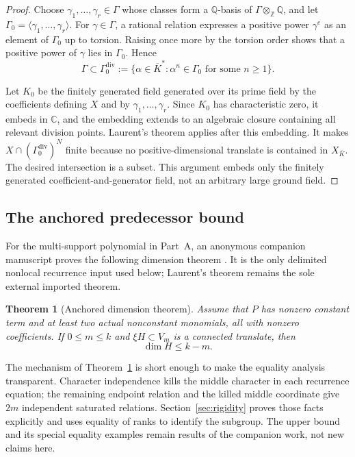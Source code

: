 \documentclass[11pt]{article}
\newcommand{\Z}{\mathbb{Z}}
\newcommand{\Q}{\mathbb{Q}}
\newcommand{\divh}{\mathrm{div}}
\newtheorem{theorem}[lemma]{Theorem}
\theoremstyle{remark}
\numberwithin{equation}{section}
\begin{document}
\begin{proof}
Choose \(\gamma_1,\ldots,\gamma_r\in\Gamma\) whose classes form a \(\Q\)-basis of \(\Gamma\otimes_\Z\Q\), and let \(\Gamma_0=\langle\gamma_1,\ldots,\gamma_r\rangle\).  For \(\gamma\in\Gamma\), a rational relation expresses a positive power \(\gamma^e\) as an element of \(\Gamma_0\) up to torsion.  Raising once more by the torsion order shows that a positive power of \(\gamma\) lies in \(\Gamma_0\).  Hence
\[
 \Gamma\subset\Gamma_0^{\divh}
 :=\{\alpha\in\overline K^\ast:\alpha^n\in\Gamma_0
 \text{ for some }n\geq1\}.
\]

Let \(K_0\) be the finitely generated field generated over its prime field by the coefficients defining \(X\) and by \(\gamma_1,\ldots,\gamma_r\).  Since \(K_0\) has characteristic zero, it embeds in \(\mathbb C\), and the embedding extends to an algebraic closure containing all relevant division points.  Laurent's theorem applies after this embedding.  It makes \(X\cap(\Gamma_0^{\divh})^N\) finite because no positive-dimensional translate is contained in \(X_{\overline K}\).  The desired intersection is a subset.  This argument embeds only the finitely generated coefficient-and-generator field, not an arbitrary large ground field.
\end{proof}

\subsection{The anchored predecessor bound}

For the multi-support polynomial in Part~A, an anonymous companion manuscript proves the following dimension theorem \citep{companionDecay}.  It is the only delimited nonlocal recurrence input used below; Laurent's theorem remains the sole external imported theorem.

\begin{theorem}[Anchored dimension theorem]\label{thm:anchored-bound}
Assume that \(P\) has nonzero constant term and at least two actual nonconstant monomials, all with nonzero coefficients.  If \(0\leq m\leq k\) and \(\xi H\subset V_m\) is a connected translate, then
\[
 \dim H\leq k-m.
\]
\end{theorem}

The mechanism of Theorem~\ref{thm:anchored-bound} is short enough to make the equality analysis transparent.  Character independence kills the middle character in each recurrence equation; the remaining endpoint relation and the killed middle coordinate give \(2m\) independent saturated relations.  Section~\ref{sec:rigidity} proves those facts explicitly and uses equality of ranks to identify the subgroup.  The upper bound and its special equality examples remain results of the companion work, not new claims here.
\end{document}
